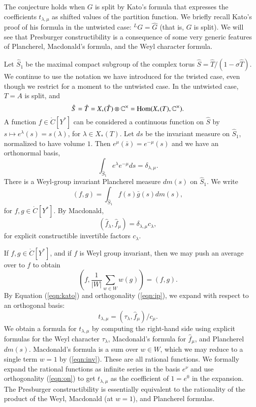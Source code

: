 The conjecture holds when $G$ is split by Kato's formula that expresses the coefficients $t_{\lambda,\mu}$ as shifted values of the partition function.
We briefly recall Kato's proof of his formula in the untwisted case: ${}^LG=\hat G$ (that is, $G$ is split).  
We will see that Presburger constructibility is a consequence
of some very generic features of Plancherel, Macdonald's formula, and the Weyl character formula.

Let $\hat S_1$ be the maximal compact subgroup of the complex torus $\hat S = \hat T/(1-\sigma \hat T)$.   
We continue to use the notation we have introduced for the twisted case, even though we restrict for a moment to the untwisted case.
In the untwisted case, $T=A$ is split, and
\[
\hat S  = \hat T = X_*(\hat T)\otimes \mathbb{C}^\times  = {\operatorname{Hom}}(X_*(T),\mathbb{C}^\times).
\]
A function $f\in \ring{C}[Y^*]$ can be considered a continuous function on $\hat S$
by $s\mapsto e^\lambda(s) = s(\lambda)$, for $\lambda\in X_*(T)$.
Let $ds$ be the invariant measure on $\hat S_1$, normalized to have volume $1$.  
Then $e^\mu(\bar s) = e^{-\mu}(s)$ and we have an orthonormal basis,
\begin{equation}\label{eqn:on}
\int_{\hat S_1} e^\lambda e^{-\mu} ds = \delta_{\lambda,\mu}.
\end{equation}
There is a Weyl-group invariant Plancherel measure $dm(s)$ on $\hat S_1$.
We write 
\[
(f,g) = \int_{\hat S_1} f(s) \bar{g} {(s)} dm(s), 
\]
for $f,g\in \ring{C}[Y^*]$.
By Macdonald,
\begin{equation}\label{eqn:ip}
(\hat f_\lambda,\hat f_\mu) = \delta_{\lambda,\mu} c_\lambda,
\end{equation}
for explicit constructible invertible factors $c_\lambda$.

If $f,g\in \ring{C}[Y^*]$, and if $f$ is Weyl group invariant, then we may push an average over to $f$ to obtain
\begin{equation}\label{eqn:inv}
(f,\frac{1}{|W|}\sum_{w\in W} w(g)) = (f,g).
\end{equation}
By Equation (\ref{eqn:kato}) and orthogonality (\ref{eqn:ip}), we expand with respect to an
orthogonal basis:
\[
t_{\lambda,\mu}  = (\tau_\lambda,\hat f_\mu)/c_\mu.
\]
We obtain a formula for $t_{\lambda,\mu}$ by computing the right-hand side using explicit formulas
for the Weyl character $\tau_\lambda$, Macdonald's formula for $\hat f_\mu$, and  Plancherel $dm(s)$.
Macdonald's formula is a sum over $w\in W$, which we may reduce to a single term $w=1$ by (\ref{eqn:inv}).
These are all rational functions.  We formally expand the rational functions as infinite series in the basis $e^\nu$ and
use orthogonality (\ref{eqn:on}) to get $t_{\lambda,\mu}$ as the coefficient of $1=e^0$ in the expansion.
The Presburger constructibility is essentially equivalent to the rationality of the product of the Weyl, Macdonald (at $w=1$), and Plancherel formulas.


